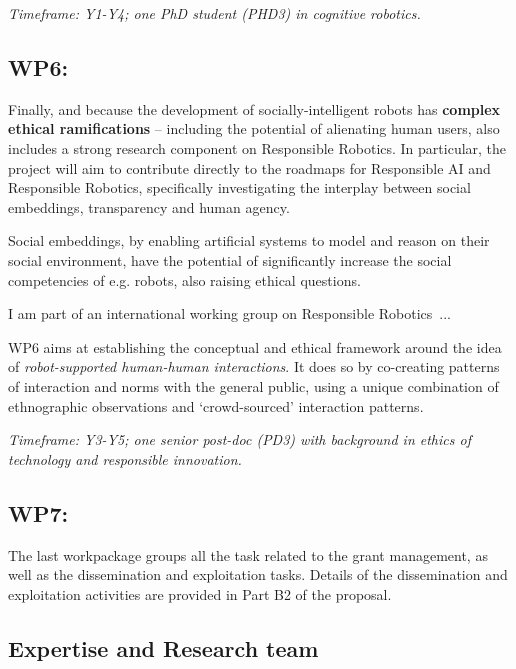 
\vspace{1em}
\noindent\emph{Timeframe: Y1-Y4; one PhD student (PHD3) in cognitive
    robotics.}


\subsection{WP6: \textbf{\wpSix}}

Finally, and because the development of socially-intelligent robots has
\textbf{complex ethical ramifications} -- including the potential of alienating
human users, \project also includes a strong research component on Responsible
Robotics. In particular, the project will aim to contribute directly to the
roadmaps for Responsible AI and Responsible Robotics, specifically investigating
the interplay between social embeddings, transparency and human agency.


Social embeddings, by enabling artificial systems to model and reason on their
social environment, have the potential of significantly increase the social
competencies of e.g. robots, also raising ethical questions.

I am part of an international working group on Responsible Robotics~...

WP6 aims at establishing the conceptual and ethical framework around the idea of
\emph{robot-supported human-human interactions}. It does so by co-creating
patterns of interaction and norms with the general public, using a unique
combination of ethnographic observations and `crowd-sourced' interaction
patterns.

\vspace{1em}
\noindent\emph{Timeframe: Y3-Y5; one senior post-doc (PD3)
with background in ethics of technology and responsible innovation.}


\subsection{WP7: \textbf{\wpSeven}}

The last workpackage groups all the task related to the grant management, as
well as the dissemination and exploitation tasks. Details of the dissemination
and exploitation activities are provided in Part B2 of the proposal.


\subsection{Expertise and Research team}
\label{research-team}

